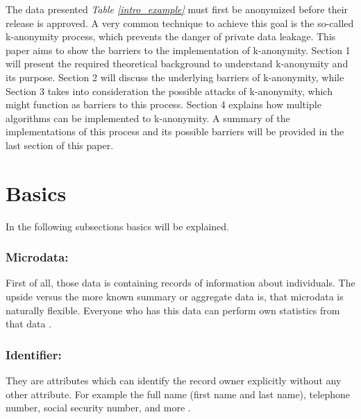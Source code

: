 \documentclass{llncs}
\begin{document}
The data presented \textit{Table \ref{intro_example}} must first be anonymized before their release is approved. A very common technique to achieve this goal is the so-called k-anonymity process, which prevents the danger of private data leakage. This paper aims to show the barriers to the implementation of k-anonymity. Section 1 will present the required theoretical background to understand k-anonymity and its purpose. Section 2 will discuss the underlying barriers of k-anonymity, while Section 3 takes into consideration the possible attacks of k-anonymity, which might function as barriers to this process. Section 4 explains how multiple algorithms can be implemented to k-anonymity. A summary of the implementations of this process and its possible barriers  will be provided in the last section of this paper.
\newpage
\section{Basics}
In the following subsections basics will be explained. 
\subsubsection{Microdata:}
First of all, those data is containing records of information about individuals. The upside versus the more known summary or aggregate data is, that microdata is naturally flexible. Everyone who has this data can perform own statistics from that data \cite{microdataweb}.
\subsubsection{Identifier:}
They are attributes which can identify the record owner explicitly without any other attribute. For example the full name (first name and last name), telephone number, social security number, and more \cite{domingo2008critique}.
\end{document}
